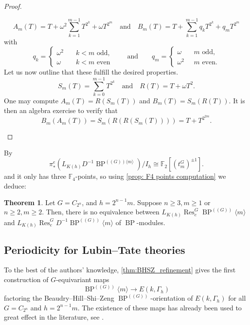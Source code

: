 \documentclass[a4paper, 10pt]{article}
\newcommand{\F}{\mathbb F}
\newcommand{\BPG}{{\BP^{(\!(G)\!)}}}
\newcommand{\BPGm}{{\BP^{(\!(G)\!)}}\langle m\rangle}
\newcommand{\BP}{\operatorname{BP}}
\newcommand{\Res}{\operatorname{Res}}
\theoremstyle{definition}
\newtheorem{theorem}[theorem]{Theorem}
\begin{document}
\begin{proof}
\begin{enumerate}[(i)]
        \[
            A_m(T) = T + \omega^2 \sum_{k=1}^{m-1} T^{2^k} + \omega T^{2^m} \quad \text{and} \quad B_m(T) = T + \sum_{k=1}^{m-1} q_k T^{2^k} + q_m T^{2^m} \]
        with
        \[ q_k = \begin{cases}
            \omega^2 \quad & k<m \text{ odd},
            \\ \omega & k<m \text{ even}
        \end{cases} \qquad \text{and} \qquad q_m = \begin{cases}
            \omega \quad & m \text{ odd},
            \\ \omega^2 & m \text{ even}.
        \end{cases} \]
        Let us now outline that these fulfill the desired properties.
        \[ S_m(T) = \sum_{k=0}^{m-1} T^{2^k} \quad \text{and} \quad R(T) = T + \omega T^2. \]
        One may compute $A_m(T) = R(S_m(T))$ and $B_m(T) = S_m(R(T))$. It is then an algebra exercise to verify that
        \[ B_m(A_m(T)) = S_m(R(R(S_m(T)))) = T + T^{2^{2m}}. \]
        \qedhere
    \end{enumerate}
\end{proof}

By \cite[Proposition 7.1]{beaudryHillShiZeng2021modelsLubinTate}
    \[
    \pi_*^e \left(L_{K(h)} D^{-1}\BP^{(\!(G)\!) \langle m \rangle} \right)/I_h \cong \F_2[(t^{G}_m)^{\pm 1}].
    \]
and it only has three $\F_4$-points, so using \cref{prop: F4 points computation} we deduce: 
\begin{theorem} \label{theorem: not higher real k theory}
    Let \(G=C_{2^n}\), and \(h=2^{n-1}m\). Suppose \(n\geq 3, m\geq 1\) or \(n\geq 2,m\geq 2\).
    Then, there is no equivalence between \(L_{K(h)}\Res^G_e\BPGm\) and \(L_{K(h)}\Res^G_e D^{-1} \BPGm\) of $\BP$-modules.
\end{theorem}

\subsection{Periodicity for Lubin--Tate theories}
\label{subsection: periodicity lubin tate}
To the best of the authors' knowledge, \cref{thm:BHSZ_refinement} gives the first construction of \(G\)-equivariant maps 
\[ \BPGm\longrightarrow E(k,\Gamma_h) \] 
factoring the Beaudry--Hill--Shi--Zeng \(\BPG\)-orientation of \(E(k,\Gamma_h)\) for all \(G=C_{2^n}\) and \(h=2^{n-1}m\).
The existence of these maps has already been used to great effect in the literature, see \cite{meier2024transchromaticphenomenaequivariantslice,duan2025periodicityfinitecomplexityhigher}.
\end{document}
